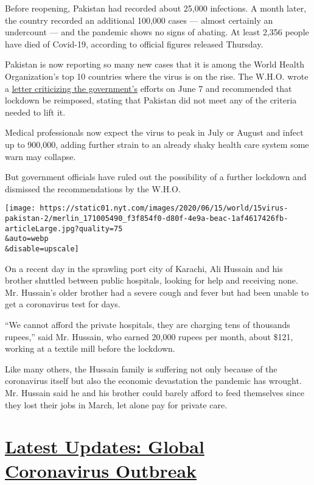 Before reopening, Pakistan had recorded about 25,000 infections. A month
later, the country recorded an additional 100,000 cases --- almost
certainly an undercount --- and the pandemic shows no signs of abating.
At least 2,356 people have died of Covid-19, according to official
figures released Thursday.

Pakistan is now reporting so many new cases that it is among the World
Health Organization's top 10 countries where the virus is on the rise.
The W.H.O. wrote a \href{https://www.dawn.com/news/1562494}{letter
criticizing the government's} efforts on June 7 and recommended that
lockdown be reimposed, stating that Pakistan did not meet any of the
criteria needed to lift it.

Medical professionals now expect the virus to peak in July or August and
infect up to 900,000, adding further strain to an already shaky health
care system some warn may collapse.

But government officials have ruled out the possibility of a further
lockdown and dismissed the recommendations by the W.H.O.

\texttt{[image: https://static01.nyt.com/images/2020/06/15/world/15virus-pakistan-2/merlin\_171005490\_f3f854f0-d80f-4e9a-beac-1af4617426fb-articleLarge.jpg?quality=75\\\&auto=webp\\\&disable=upscale]}

On a recent day in the sprawling port city of Karachi, Ali Hussain and
his brother shuttled between public hospitals, looking for help and
receiving none. Mr. Hussain's older brother had a severe cough and fever
but had been unable to get a coronavirus test for days.

``We cannot afford the private hospitals, they are charging tens of
thousands rupees,'' said Mr. Hussain, who earned 20,000 rupees per
month, about \$121, working at a textile mill before the lockdown.

Like many others, the Hussain family is suffering not only because of
the coronavirus itself but also the economic devastation the pandemic
has wrought. Mr. Hussain said he and his brother could barely afford to
feed themselves since they lost their jobs in March, let alone pay for
private care.

\hypertarget{latest-updates-global-coronavirus-outbreak}{%
\section{\texorpdfstring{\href{https://www.nytimes.com/2020/08/04/world/coronavirus-cases.html?action=click\&pgtype=Article\&state=default\&region=MAIN_CONTENT_1\&context=storylines_live_updates}{Latest
Updates: Global Coronavirus
Outbreak}}{Latest Updates: Global Coronavirus Outbreak}}\label{latest-updates-global-coronavirus-outbreak}}

